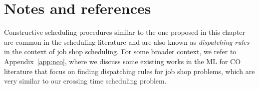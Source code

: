\documentclass[a4paper]{report}
\theoremstyle{definition}
\theoremstyle{plain}
\begin{document}
% 
% 


%

\clearpage
\section{Notes and references}

Constructive scheduling procedures similar to the one proposed in this chapter
are common in the scheduling literature and are also known as \emph{dispatching
  rules} in the context of job shop scheduling. For some broader context, we
refer to Appendix~\ref{app:nco}, where we discuss some existing works in the ML for CO
literature that focus on finding dispatching rules for job shop problems, which
are very similar to our crossing time scheduling problem.

\end{document}
